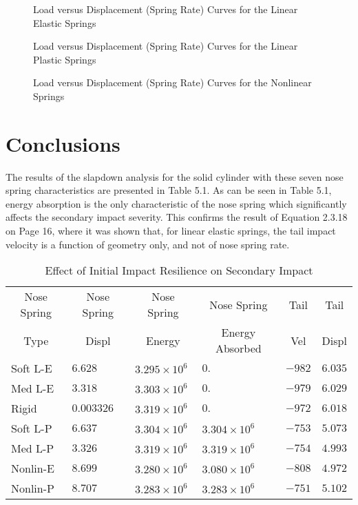 \begin{figure}
\vspace{3.5 in}
\caption{Load versus Displacement (Spring Rate) Curves for the Linear
Elastic Springs}
\end{figure}

\begin{figure}
\vspace{3.5 in}
\caption{Load versus Displacement (Spring Rate) Curves for the Linear
Plastic Springs}
\end{figure}

\begin{figure}
\vspace{3.5 in}
\caption{Load versus Displacement (Spring Rate) Curves for the
Nonlinear Springs}
\end{figure}

\section{Conclusions}

     The results of the slapdown analysis for the
solid cylinder with these
seven nose spring characteristics are presented in Table 5.1.  As can
be seen in Table 5.1, energy absorption is the only characteristic of
the nose spring which significantly affects the secondary impact
severity.  This confirms the result of Equation 2.3.18 on Page 16,
where it was shown that, for linear elastic springs, the tail impact
velocity is
a function of geometry only, and not of nose spring rate.

\begin{table}
\begin{center}
\caption{Effect of Initial Impact Resilience on Secondary Impact}
\begin{tabular}{||l|l|l|l|l|l||}
\hline
\multicolumn{1}{||c}{Nose Spring}
&\multicolumn{1}{|c}{Nose Spring}
&\multicolumn{1}{|c}{Nose Spring}
&\multicolumn{1}{|c}{Nose Spring}
&\multicolumn{1}{|c}{Tail}
&\multicolumn{1}{|c||}{Tail}\\
\multicolumn{1}{||c}{Type}
&\multicolumn{1}{|c}{Displ}
&\multicolumn{1}{|c}{Energy}
&\multicolumn{1}{|c}{Energy Absorbed}
&\multicolumn{1}{|c}{Vel}
&\multicolumn{1}{|c||}{Displ}\\
\hline
Soft L-E &$6.628$ &$3.295\times10^6$ &$0.$ &$-982$ &$6.035$\\
Med L-E  &$3.318$ &$3.303\times10^6$ &$0.$ &$-979$ &$6.029$\\
Rigid    &$0.003326$ &$3.319\times10^6$ &$0.$ &$-972$ &$6.018$\\
Soft L-P &$6.637$ &$3.304\times10^6$ &$3.304\times10^6$ &$-753$ &$5.073$\\
Med L-P  &$3.326$ &$3.319\times10^6$ &$3.319\times10^6$ &$-754$ &$4.993$\\
Nonlin-E &$8.699$ &$3.280\times10^6$ &$3.080\times10^6$ &$-808$ &$4.972$\\
Nonlin-P &$8.707$ &$3.283\times10^6$ &$3.283\times10^6$ &$-751$ &$5.102$\\
\hline
\end{tabular}
\end{center}
\end{table}

